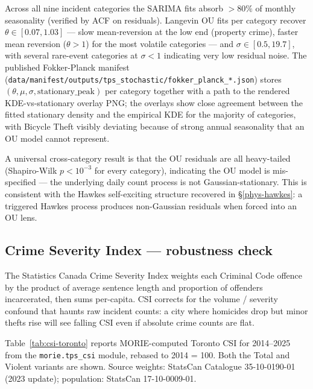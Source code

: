 \documentclass[article,shortnames,nojss]{jss}
\begin{document}
Across all nine incident categories the SARIMA fits absorb
$>80\%$ of monthly seasonality (verified by ACF on residuals).
Langevin OU fits per category recover $\theta\in[0.07,1.03]$ —
slow mean-reversion at the low end (property crime), faster mean
reversion ($\theta>1$) for the most volatile categories — and
$\sigma\in[0.5,19.7]$, with several rare-event categories at
$\sigma<1$ indicating very low residual noise.  The published
Fokker-Planck manifest
(\texttt{data/manifest/outputs/tps\_stochastic/fokker\_planck\_*.json})
stores $(\theta,\mu,\sigma,\text{stationary\_peak})$ per category
together with a path to the rendered KDE-vs-stationary overlay PNG;
the overlays show close agreement between the fitted stationary
density and the empirical KDE for the majority of categories,
with Bicycle Theft visibly deviating because of strong annual
seasonality that an OU model cannot represent.

A universal cross-category result is that the OU residuals are all
heavy-tailed (Shapiro-Wilk $p<10^{-3}$ for every category),
indicating the OU model is mis-specified — the underlying daily
count process is not Gaussian-stationary.  This is consistent with
the Hawkes self-exciting structure recovered in §\ref{phys-hawkes}:
a triggered Hawkes process produces non-Gaussian residuals when
forced into an OU lens.

\subsection{Crime Severity Index — robustness check}\label{phys-csi}

The Statistics Canada Crime Severity Index
\cite{Wallace2009CSI} weights each Criminal Code offence by the
product of average sentence length and proportion of offenders
incarcerated, then sums per-capita.  CSI corrects for the volume /
severity confound that haunts raw incident counts: a city where
homicides drop but minor thefts rise will see falling CSI even if
absolute crime counts are flat.

Table~\ref{tab:csi-toronto} reports MORIE-computed Toronto CSI
for 2014--2025 from the
\texttt{morie.tps\_csi} module, rebased to 2014 = 100.  Both
the Total and Violent variants are shown.  Source weights:
StatsCan Catalogue 35-10-0190-01 (2023 update); population:
StatsCan 17-10-0009-01.
\end{document}
